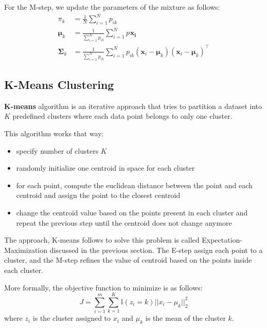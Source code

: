 \documentclass[12pt]{report}
\begin{document}
            For the M-step, we update the parameters of the mixture as follows:
            \begin{align}
                \pi_k &= \frac{1}{N}\sum_{i=1}^{N} p_{ik}\\
                \boldsymbol{\mu}_k &= \frac{1}{\sum_{i=1}^{N} p_{ik}} \sum_{i=1}^{N} p_{} \boldsymbol{x_i}\\
                \boldsymbol{\Sigma}_k &= \frac{1}{\sum_{i=1}^{N} p_{ik}} \sum_{i=1}^{N} p_{ik} (\boldsymbol{x}_i - \boldsymbol{\mu}_k) (\boldsymbol{x}_i - \boldsymbol{\mu}_k)^\top
            \end{align}
            
    
        \subsection{K-Means Clustering}
            \textbf{K-means} algorithm is an iterative approach that tries to partition a dataset into $K$ predefined clusters where each data point belongs to only one cluster. 
            
            This algorithm works that way:
            \begin{itemize}
                \item specify number of clusters $K$
                \item randomly initialize one centroid in space for each cluster
                \item for each point, compute the euclidean distance between the point and each centroid and assign the point to the closest centroid
                \item change the centroid value based on the points present in each cluster and repeat the previous step until the centroid does not change anymore
            \end{itemize}
            
            The approach, K-means follows to solve this problem is called Expectation-Maximization discussed in the previous section. The E-step assign each point to a cluster, and the M-step refines the value of centroid based on the points inside each cluster.
            
            More formally, the objective function to minimize is as follows:
            \begin{equation}
                J = \sum_{i=1}^{m} \sum_{k=1}^{K} \mathbb{I}(z_i = k)||x_i - \mu_k||_2^2
            \end{equation}
            where $z_i$ is the cluster assigned to $x_i$ and $\mu_k$ is the mean of the cluster $k$.
            
\end{document}
